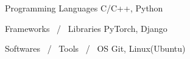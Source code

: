 

\begin{cvskills}

  \cvskill
    {Programming Languages} %
    {C/C++, Python} %


  \cvskill
    {Frameworks \, / \, Libraries} %
    {PyTorch, Django} %

\cvskill
    {Softwares \, / \, Tools \, / \, OS} %
    {Git, Linux(Ubuntu)} %

\end{cvskills}

